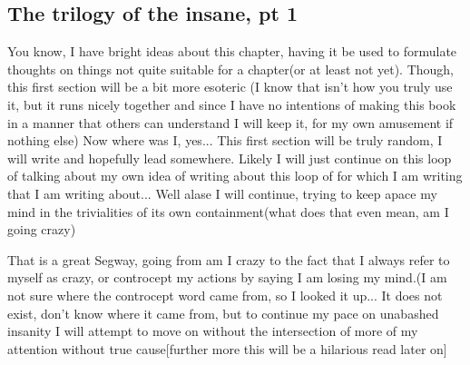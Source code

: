 \subsection{The trilogy of the insane, pt 1}
\par You know, I have bright ideas about this chapter, having it be used to formulate thoughts on things not quite suitable for a chapter(or at least not yet). Though, this first section will be a bit more esoteric (I know that isn't how you truly use it, but it runs nicely together and since I have no intentions of making this book in a manner that others can understand I will keep it, for my own amusement if nothing else) Now where was I, yes... This first section will be truly random, I will write and hopefully lead somewhere. Likely I will just continue on this loop of talking about my own idea of writing about this loop of for which I am writing that I am writing about... Well alase I will continue, trying to keep apace my mind in the trivialities of its own containment(what does that even mean, am I going crazy)
\par That is a great Segway, going from am I crazy to the fact that I always refer to myself as crazy, or controcept my actions by saying I am losing my mind.(I am not sure where the controcept word came from, so I looked it up... It does not exist, don't know where it came from, but to continue my pace on unabashed insanity I will attempt to move on without the intersection of more of my attention without true cause[further more this will be a hilarious read later on] 
